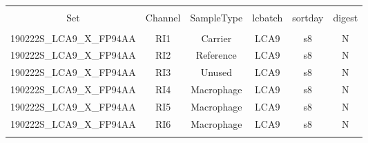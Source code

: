 
\begin{table}[!htbp] \centering 
  \caption{} 
  \label{} 
\begin{tabular}{@{\extracolsep{5pt}} cccccc} 
\\[-1.8ex]\hline 
\hline \\[-1.8ex] 
Set & Channel & SampleType & lcbatch & sortday & digest \\ 
\hline \\[-1.8ex] 
190222S\_LCA9\_X\_FP94AA & RI1 & Carrier & LCA9 & s8 & N \\ 
190222S\_LCA9\_X\_FP94AA & RI2 & Reference & LCA9 & s8 & N \\ 
190222S\_LCA9\_X\_FP94AA & RI3 & Unused & LCA9 & s8 & N \\ 
190222S\_LCA9\_X\_FP94AA & RI4 & Macrophage & LCA9 & s8 & N \\ 
190222S\_LCA9\_X\_FP94AA & RI5 & Macrophage & LCA9 & s8 & N \\ 
190222S\_LCA9\_X\_FP94AA & RI6 & Macrophage & LCA9 & s8 & N \\ 
\hline \\[-1.8ex] 
\end{tabular} 
\end{table} 
